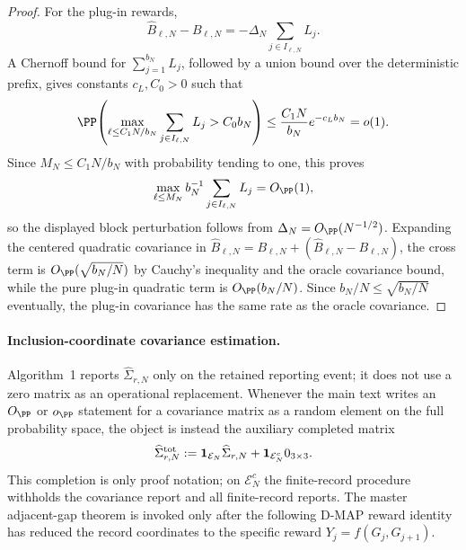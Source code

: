 \begin{proof}
For the plug-in rewards,
\[
\widehat B_{\ell,N}-B_{\ell,N}
=-\Delta_N\sum_{j\in I_{\ell,N}}L_j .
\]
A Chernoff bound for \(\sum_{j=1}^{b_N}L_j\), followed by a union bound over
the deterministic prefix, gives constants \(c_L,C_0>0\) such that
\[
\PP\!\left(
\max_{\ell\le C_1N/b_N}\sum_{j\in I_{\ell,N}}L_j>C_0b_N
\right)
\le \frac{C_1N}{b_N}e^{-c_Lb_N}=o(1).
\]
Since \(M_N\le C_1N/b_N\) with probability tending to one, this proves
\[
\max_{\ell\le M_N}b_N^{-1}\sum_{j\in I_{\ell,N}}L_j=O_{\PP}(1),
\]
so the displayed block perturbation follows from
\(\Delta_N=O_{\PP}(N^{-1/2})\).  Expanding the centered quadratic covariance in
\(\widehat B_{\ell,N}=B_{\ell,N}+(\widehat B_{\ell,N}-B_{\ell,N})\), the cross
term is \(O_{\PP}(\sqrt{b_N/N})\) by Cauchy's inequality and the oracle
covariance bound, while the pure plug-in quadratic term is
\(O_{\PP}(b_N/N)\).  Since \(b_N/N\le\sqrt{b_N/N}\) eventually, the plug-in
covariance has the same rate as the oracle covariance.
\end{proof}

\paragraph{Inclusion-coordinate covariance estimation.}
Algorithm~1 reports \(\widehat\Sigma_{r,N}\) only on the retained reporting
event; it does not use a zero matrix as an operational replacement.  Whenever
the main text writes an \(O_{\PP}\) or \(o_{\PP}\) statement for a covariance
matrix as a random element on the full probability space, the object is instead
the auxiliary completed matrix
\[
\widehat\Sigma_{r,N}^{\rm tot}
:=\mathbf 1_{\mathcal E_N}\widehat\Sigma_{r,N}
+\mathbf 1_{\mathcal E_N^c}0_{3\times3}.
\]
This completion is only proof notation; on \(\mathcal E_N^c\) the finite-record
procedure withholds the covariance report and all finite-record reports.  The
master adjacent-gap theorem
 is invoked only after
the following D-MAP reward identity has reduced the record coordinates to the
specific reward \(Y_j=f(G_j,G_{j+1})\).

